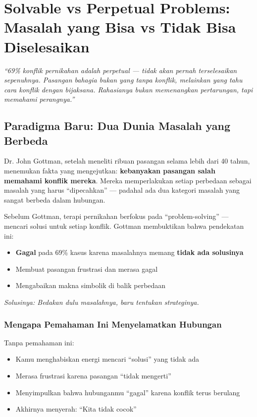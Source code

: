 \chapter{Solvable vs Perpetual Problems: Masalah yang Bisa vs Tidak Bisa Diselesaikan}

\begin{insightbox}
\textit{``69\% konflik pernikahan adalah perpetual --- tidak akan pernah terselesaikan sepenuhnya. Pasangan bahagia bukan yang tanpa konflik, melainkan yang tahu cara  konflik dengan bijaksana. Rahasianya bukan memenangkan pertarungan, tapi memahami perangnya.''}
\end{insightbox}

\section{Paradigma Baru: Dua Dunia Masalah yang Berbeda}

Dr. John Gottman, setelah meneliti ribuan pasangan selama lebih dari 40 tahun, menemukan fakta yang mengejutkan: \textbf{kebanyakan pasangan salah memahami konflik mereka}. Mereka memperlakukan setiap perbedaan sebagai masalah yang harus ``dipecahkan'' --- padahal ada dua kategori masalah yang sangat berbeda dalam hubungan.

\begin{praktikbox}
Sebelum Gottman, terapi pernikahan berfokus pada ``problem-solving'' --- mencari solusi untuk setiap konflik. Gottman membuktikan bahwa pendekatan ini:\
\begin{itemize}
    \item \textbf{Gagal} pada 69\% kasus karena masalahnya memang \textbf{tidak ada solusinya}
    \item Membuat pasangan frustrasi dan merasa gagal
    \item Mengabaikan makna simbolik di balik perbedaan
\end{itemize}
\textit{Solusinya: Bedakan dulu masalahnya, baru tentukan strateginya.}
\end{praktikbox}

\subsection{Mengapa Pemahaman Ini Menyelamatkan Hubungan}

Tanpa pemahaman ini:
\begin{itemize}
    \item Kamu menghabiskan energi mencari ``solusi'' yang tidak ada
    \item Merasa frustrasi karena pasangan ``tidak mengerti''
    \item Menyimpulkan bahwa hubunganmu ``gagal'' karena konflik terus berulang
    \item Akhirnya menyerah: ``Kita tidak cocok''
\end{itemize}

